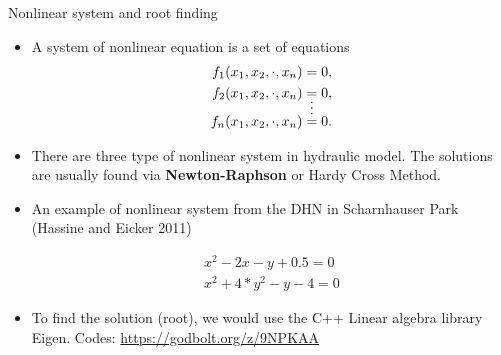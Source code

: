 \documentclass[xcolor=dvipsnames]{beamer}
\begin{document}
\begin{frame}[shrink=20]{Nonlinear system and root finding}

\begin{itemize}
	\item A system of nonlinear equation is a set of equations 
	\begin{align*}
		f_1(x_1,x_2,\cdot,x_n)&=0,\\
		f_2(x_1,x_2,\cdot,x_n)&=0,\\
		&\shortvdotswithin{=}
		f_n(x_1,x_2,\cdot,x_n)&=0.
	\end{align*}
	\item There are three type of nonlinear system in hydraulic model. The solutions are usually found via 
	\textbf{Newton-Raphson} or Hardy Cross Method.

	\item An example of nonlinear system from the DHN in Scharnhauser Park (Hassine and Eicker 2011)

	\begin{align*}
		x^2-2x-y+0.5=0\\
		x^2+4*y^2-y-4=0
	\end{align*}

	\item To find the solution (root), we would use the C++ Linear algebra library {\color{purple}Eigen}.  %
	Codes: \url{https://godbolt.org/z/9NPKAA}

\end{itemize}
\end{frame}




\end{document}
